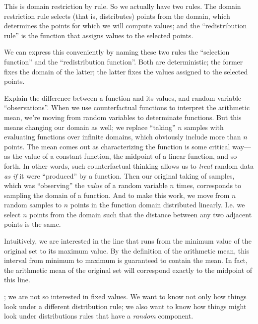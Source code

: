 \begin{ednote}
  This is domain restriction by rule.  So we actually have two rules.
  The domain restriction rule selects (that is, distributes) points
  from the domain, which determines the points for which we will
  compute values; and the ``redistribution rule'' is the function that
  assigns values to the selected points.

  We can express this conveniently by naming these two rules the
  ``selection function'' and the ``redistribution function''.  Both
  are deterministic; the former fixes the domain of the latter; the
  latter fixes the values assigned to the selected points.

  Explain the difference between a function and its values, and random
  variable ``observations''.  When we use counterfactual functions to
  interpret the arithmetic mean, we're moving from random variables to
  determinate functions.  But this means changing our domain as well;
  we replace ``taking'' \(n\) samples with evaluating functions over
  infinite domains, which obviously include more than \(n\) points.
  The mean comes out as characterizing the function is some critical
  way---as the value of a constant function, the midpoint of a linear
  function, and so forth.  In other words, such counterfactual
  thinking allows us to \emph{treat} random data \emph{as if} it were
  ``produced'' by a function.  Then our original taking of samples,
  which was ``observing'' the \emph{value} of a random variable \(n\)
  times, corresponds to sampling the domain of a function.  And to
  make this work, we move from \(n\) random samples to \(n\) points in
  the function domain distributed linearly.  I.e. we select \(n\)
  points from the domain such that the distance between any two
  adjacent points is the same.

\end{ednote}

 Intuitively, we are interested in the line that runs from
the minimum value of the original set to its maximum value.  By the
definition of the arithmetic mean, this interval from minimum to
maximum is guaranteed to contain the mean.  In fact, the arithmetic
mean of the original set will correspond exactly to the midpoint of
this line.



; we are not so interested in fixed
values.  We want to know not only how things look under a different
distribution rule; we also want to know how things might look under
distributions rules that have a \emph{random} component.

